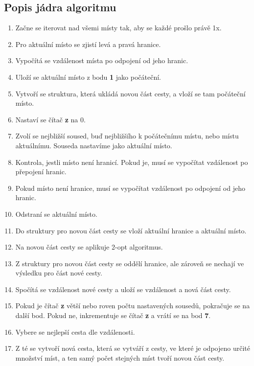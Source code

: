 \subsection{Popis jádra algoritmu}
\begin{enumerate}
\item Začne se iterovat nad všemi místy tak, aby se každé prošlo právě 1x.
\item Pro aktuální místo se zjistí levá a pravá hranice.
\item Vypočítá se vzdálenost místa po odpojení od jeho hranic.
\item Uloží se aktuální místo z bodu \textbf{1} jako počáteční.
\item Vytvoří se struktura, která ukládá novou část cesty, a vloží se tam počáteční místo.
\item Nastaví se čítač \textbf{z} na 0.
\item Zvolí se nejbližší soused, buď nejbližšího k počátečnímu místu, nebo místu aktuálnímu. Souseda nastavíme jako aktuální místo.
\item Kontrola, jestli místo není hranicí. Pokud je, musí se vypočítat vzdálenost po přepojení hranic.
\item Pokud místo není hranice, musí se vypočítat vzdálenost po odpojení od jeho hranic.
\item Odstraní se aktuální místo.
\item Do struktury pro novou část cesty se vloží aktuální hranice a aktuální místo.
\item Na novou část cesty se aplikuje 2-opt algoritmus.
\item Z struktury pro novou část cesty se oddělí hranice, ale zároveň se nechají ve výsledku pro část nové cesty.
\item Spočítá se vzdálenost nové cesty a uloží se vzdálenost a nová část cesty.
\item Pokud je čítač \textbf{z} větší nebo roven počtu nastavených sousedů, pokračuje se na další bod. Pokud ne, inkrementuje se čítač \textbf{z} a vrátí se na bod \textbf{7}.
\item Vybere se nejlepší cesta dle vzdálenosti.
\item Z té se vytvoří nová cesta, která se vytváří z cesty, ve které je odpojeno určité množství míst, a ten samý počet stejných míst tvoří novou část cesty.
\end{enumerate}


